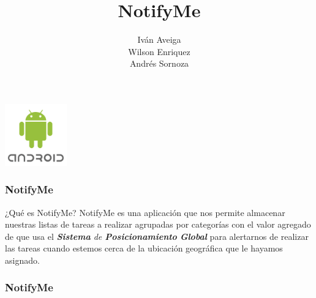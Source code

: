 \documentclass[9pt]{beamer}
\title{NotifyMe}
\author{Iván Aveiga \\ Wilson Enriquez \\ Andrés Sornoza}
\institute{Escuela Superior Politécnica del Litoral}
\begin{document}
	\begin{frame}
		\begin{center}
			\includegraphics[width=0.20\textwidth]{android.png}
		\end{center}
		\titlepage
		\scriptsize
	\end{frame}	
	
	\begin{frame}
		\frametitle{NotifyMe}
			\begin{block}{¿Qué es NotifyMe?}
				NotifyMe es una aplicación que nos permite almacenar nuestras listas de tareas a realizar agrupadas por categorías
				con el valor agregado de que usa el \emph{\textbf{Sistema} de \textbf{Posicionamiento} \textbf{Global}} para alertarnos
				de realizar las tareas cuando estemos cerca de la ubicación geográfica que le hayamos asignado.
			\end{block}
	\end{frame}
	
	\begin{frame}
		\frametitle{NotifyMe}
			\begin{block}{\textbf{ }}

		 \end{block}
	\end{frame}
	
\end{document}
